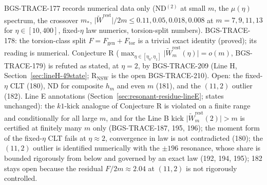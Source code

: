 \begin{remark}
BGS-TRACE-177 records numerical data only (ND\(^{(2)}\) at small \(m\), the \(\mu(\eta)\) spectrum, the crossover \(m_*\), \(\lvert\tilde W^{\mathrm{rest}}\rvert/2m\le 0.11,0.05,0.018,0.008\) at \(m=7,9,11,13\) for \(\eta\in[10,400]\), fixed-\(\eta\) law numerics, torsion-split numbers).
BGS-TRACE-178: the torsion-class split \(F=F_{\mathrm{gen}}+F_{\mathrm{tor}}\) is a trivial exact identity (proved); its reading is numerical.
Conjecture R (\(\max_{\eta\in[\eta_0,\eta_1]}\lvert\tilde W^{\mathrm{rest}}_m(\eta)\rvert=o(m)\), BGS-TRACE-179) is refuted as stated, at \(\eta=2\), by BGS-TRACE-209 (Line H, Section~\ref{sec:lineH-49state}; R\(_{\mathrm{NSW}}\) is the open BGS-TRACE-210). Open: the fixed-\(\eta\) CLT (180), ND for composite \(h_m\) and even \(m\) (181), and the \((11,2)\) outlier (182). Line E annotations (Section~\ref{sec:resonant-residue-lineE}; states unchanged): the \(k1\)-kick analogue of Conjecture R is violated on a finite range and conditionally for all large \(m\), and for the Line B kick \(\lvert\tilde W^{\mathrm{rest}}_m(2)\rvert>m\) is certified at finitely many \(m\) only (BGS-TRACE-187, 195, 196); the moment form of the fixed-\(\eta\) CLT fails at \(\eta\approx2\), convergence in law is not contradicted (180); the \((11,2)\) outlier is identified numerically with the \(\pm196\) resonance, whose share is bounded rigorously from below and governed by an exact law (192, 194, 195); 182 stays open because the residual \(F/2m\approx2.04\) at \((11,2)\) is not rigorously controlled.
\end{remark}
